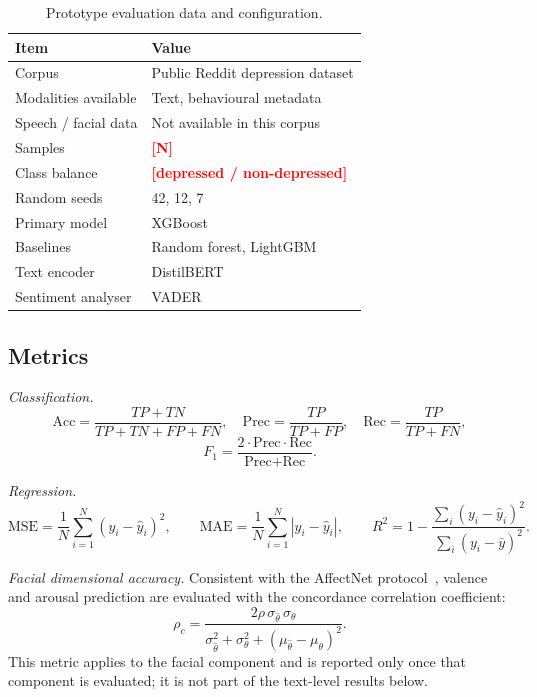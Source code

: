 \documentclass[12pt]{article}
\newcommand{\tbd}[1]{\textcolor{red}{\textbf{[#1]}}}
\begin{document}
\begin{table}[H]
\centering
\caption{Prototype evaluation data and configuration.}
\label{tab:cohort}
\begin{tabular}{@{}ll@{}}
\toprule
Item & Value \\
\midrule
Corpus & Public Reddit depression dataset \\
Modalities available & Text, behavioural metadata \\
Speech / facial data & Not available in this corpus \\
Samples & \tbd{N} \\
Class balance & \tbd{depressed / non-depressed} \\
Random seeds & 42, 12, 7 \\
Primary model & XGBoost~\cite{chen2016xgboost} \\
Baselines & Random forest, LightGBM \\
Text encoder & DistilBERT~\cite{sanh2019distilbert} \\
Sentiment analyser & VADER~\cite{hutto2014vader} \\
\bottomrule
\end{tabular}
\end{table}

\subsection{Metrics}

\emph{Classification.}
\begin{equation}
\text{Acc} = \frac{TP+TN}{TP+TN+FP+FN}, \quad
\text{Prec} = \frac{TP}{TP+FP}, \quad
\text{Rec} = \frac{TP}{TP+FN},
\end{equation}
\begin{equation}
F_{1} = \frac{2\cdot\text{Prec}\cdot\text{Rec}}{\text{Prec}+\text{Rec}} .
\end{equation}

\emph{Regression.}
\begin{equation}
\text{MSE} = \frac{1}{N}\sum_{i=1}^{N}(y_i-\hat{y}_i)^{2}, \qquad
\text{MAE} = \frac{1}{N}\sum_{i=1}^{N}|y_i-\hat{y}_i|, \qquad
R^{2} = 1 - \frac{\sum_i (y_i-\hat{y}_i)^{2}}{\sum_i (y_i-\bar{y})^{2}} .
\end{equation}

\emph{Facial dimensional accuracy.} Consistent with the AffectNet
protocol~\cite{mollahosseini2017affectnet}, valence and arousal
prediction are evaluated with the concordance correlation coefficient:
\begin{equation}
\rho_c =
\frac{2\rho\,\sigma_{\hat{\theta}}\,\sigma_{\theta}}
     {\sigma_{\hat{\theta}}^{2} + \sigma_{\theta}^{2}
      + (\mu_{\hat{\theta}} - \mu_{\theta})^{2}} .
\end{equation}
\noindent This metric applies to the facial component and is reported
only once that component is evaluated; it is not part of the text-level
results below.
\end{document}
